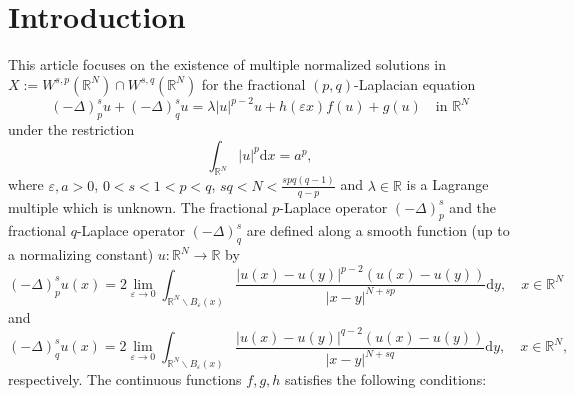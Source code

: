 \documentclass[reqno]{amsart}
\begin{document}
\section{Introduction}

This article focuses on the existence of multiple normalized solutions in
$X:=W^{s,p}(\mathbb {R}^N)\cap W^{s,q}(\mathbb {R}^N)$ for the
 fractional $(p,q)$-Laplacian equation
\begin{equation}\label{eqn-(1.1)}
(-\Delta)_p^{s} u+(-\Delta)_q^{s} u=\lambda |u|^{p-2}u+h(\varepsilon x)f(u)+g(u)\quad \text{in } \mathbb {R}^N
\end{equation}
under {the restriction}
\begin{equation}\label{eqn-(1.2)}
\int_{\mathbb {R}^{N}}|u|^p \mathrm{d}x=a^p,
\end{equation}
where $\varepsilon,a>0$,  $0<s<1<p<q$, $sq<N<\frac{spq(q-1)}{q-p}$ and
$\lambda \in \mathbb {R}$ is a Lagrange multiple which is unknown. The fractional
$p$-Laplace operator $(-\Delta)_p^{s}$ and the fractional
$q$-Laplace operator $(-\Delta)_q^{s}$
are defined along a smooth function (up to a normalizing constant)
$u:\mathbb{R}^N\to \mathbb{R}$ by
$$
(-\Delta)_p^{s} u(x)=2\lim_{\varepsilon\to 0}\int_{\mathbb{R}^N\backslash B_{\varepsilon}(x)}
\frac{|u(x)-u(y)|^{p-2}(u(x)-u(y))}{|x-y|^{N+sp}}\mathrm{d}y,\quad x\in\mathbb{R}^N
$$
and
$$
(-\Delta)_q^{s} u(x)=2\lim_{\varepsilon\to 0}\int_{\mathbb{R}^N\backslash
B_{\varepsilon}(x)}\frac{|u(x)-u(y)|^{q-2}(u(x)-u(y))}{|x-y|^{N+sq}}\mathrm{d}y,\quad x\in\mathbb{R}^N,$$
respectively. The continuous functions $f,g,h$ satisfies the following conditions:
\end{document}
